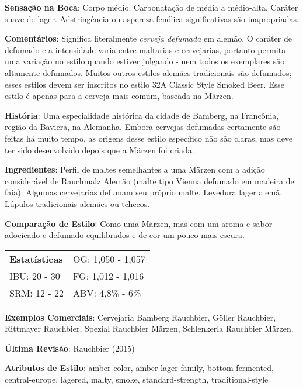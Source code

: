 \textbf{Sensação na Boca}: Corpo médio. Carbonatação de média a médio-alta. Caráter suave de lager. Adstringência ou aspereza fenólica significativas são inapropriadas.

\textbf{Comentários}: Significa literalmente \textit{cerveja defumada} em alemão. O caráter de defumado e a intensidade varia entre maltarias e cervejarias, portanto permita uma variação no estilo quando estiver julgando - nem todos os exemplares são altamente defumados. Muitos outros estilos alemães tradicionais são defumados; esses estilos devem ser inscritos no estilo 32A Classic Style Smoked Beer. Esse estilo é apenas para a cerveja mais comum, baseada na Märzen.

\textbf{História}: Uma especialidade histórica da cidade de Bamberg, na Francônia, região da Baviera, na Alemanha. Embora cervejas defumadas certamente são feitas há muito tempo, as origens desse estilo específico não são claras, mas deve ter sido desenvolvido depois que a Märzen foi criada.

\textbf{Ingredientes}: Perfil de maltes semelhantes a uma Märzen com a adição considerável de Rauchmalz Alemão (malte tipo Vienna defumado em madeira de faia). Algumas cervejarias defumam seu próprio malte. Levedura lager alemã. Lúpulos tradicionais alemães ou tchecos.

\textbf{Comparação de Estilo}: Como uma Märzen, mas com um aroma e sabor adocicado e defumado equilibrados e de cor um pouco mais escura.

\begin{tabular}{@{}p{35mm}p{35mm}@{}}
  \textbf{Estatísticas} & OG: 1,050 - 1,057 \\
  IBU: 20 - 30  & FG: 1,012 - 1,016  \\
  SRM: 12 - 22  & ABV: 4,8\% - 6\%
\end{tabular}

\textbf{Exemplos Comerciais}: Cervejaria Bamberg Rauchbier, Göller Rauchbier, Rittmayer Rauchbier, Spezial Rauchbier Märzen, Schlenkerla Rauchbier Märzen.

\textbf{Última Revisão}: Rauchbier (2015)

\textbf{Atributos de Estilo}: amber-color, amber-lager-family, bottom-fermented, central-europe, lagered, malty, smoke, standard-strength, traditional-style
